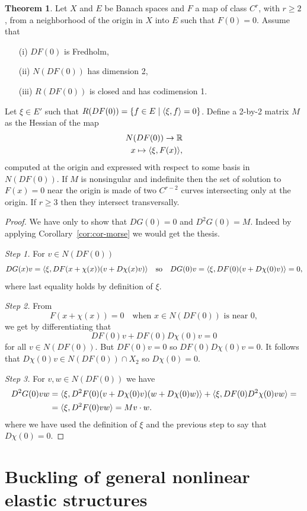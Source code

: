 \documentclass[a4paper,11pt]{article}
\theoremstyle{definition}
\newtheorem{thm}[prop]{Theorem}
\DeclarePairedDelimiter{\dual}{\langle}{\rangle}
\begin{document}
\begin{thm}
\label{thm:gen-bif}
Let $X$ and $E$ be Banach spaces and $F$ a map of class $C^r$, with $r\ge2$, from a neighborhood of the origin in $X$ into $E$ such that $F(0)=0$. Assume that
\begin{itemize}
\item[(i)] $DF(0)$ is Fredholm,
\item [(ii)] $N(DF(0))$ has dimension 2,
\item[(iii)] $R(DF(0))$ is closed and has codimension 1.
\end{itemize}
Let $\xi\in E'$ such that $R(DF(0))=\{f\in E\;|\;\dual{\xi,f}=0\}$. Define a 2-by-2 matrix $M$ as the Hessian of the map
\begin{align*}
N(DF(0))\to\mathbb{R} \\
x\mapsto\dual{\xi,F(x)},
\end{align*}
computed at the origin and expressed with respect to some basis in $N(DF(0))$. If $M$ is nonsingular and indefinite then the set of solution to $F(x)=0$ near the origin is made of two $C^{r-2}$ curves intersecting only at the origin. If $r\ge3$ then they intersect transversally.
\end{thm}
\begin{proof}
We have only to show that $DG(0)=0$ and $D^2G(0)=M$. Indeed by applying Corollary~\ref{cor:cor-morse} we would get the thesis.

\emph{Step 1.} For $v\in N(DF(0))$
\[
DG(x)v=\dual{\xi,DF(x+\chi(x))(v+D\chi(x)v)}\quad\text{so}\quad DG(0)v=\dual{\xi,DF(0)(v+D\chi(0)v)}=0,
\]
where last equality holds by definition of $\xi$.

\emph{Step 2.} From
\[
F(x+\chi(x))=0\quad\text{when $x\in N(DF(0))$ is near 0},
\]
we get by differentiating that
\[
DF(0)v+DF(0)D\chi(0)v=0
\]
for all $v\in N(DF(0))$. But $DF(0)v=0$ so $DF(0)D\chi(0)v=0$. It follows that $D\chi(0)v\in N(DF(0))\cap X_2$ so $D\chi(0)=0$.

\emph{Step 3.} For $v,w\in N(DF(0))$ we have
\begin{align*}
D^2G(0)vw&=\dual{\xi,D^2F(0)(v+D\chi(0)v)(w+D\chi(0)w)}+\dual{\xi,DF(0)D^2\chi(0)vw}=\\
&=\dual{\xi,D^2F(0)vw}=Mv\cdot w.
\end{align*}
where we have used the definition of $\xi$ and the previous step to say that $D\chi(0)=0$. 
\end{proof}

\section{Buckling of general nonlinear elastic structures}
\end{document}
